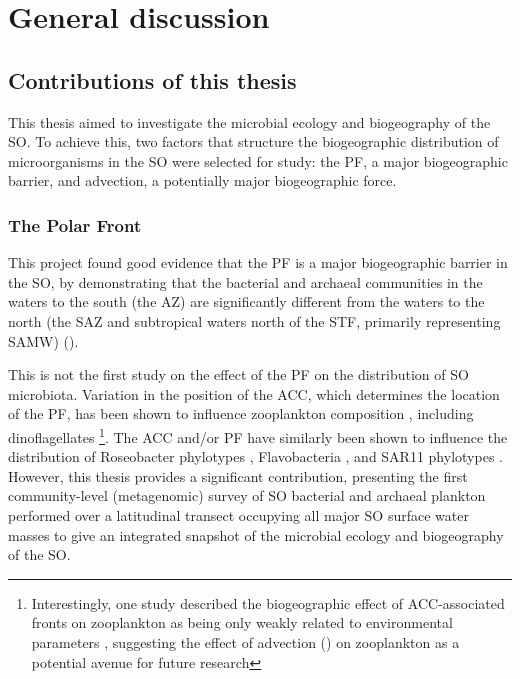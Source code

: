 \chapter{General discussion}
\label{ch:generaldiscussion}

\section{Contributions of this thesis}

This thesis aimed to investigate the microbial ecology and biogeography of the \ac{SO}.
To achieve this, two factors that structure the biogeographic distribution of microorganisms in the \ac{SO} were selected for study: the \ac{PF}, a major biogeographic barrier, and advection, a potentially major biogeographic force.

\subsection{The Polar Front}

This project found good evidence that the \ac{PF} is a major biogeographic barrier in the \ac{SO}, by demonstrating that the bacterial and archaeal communities in the waters to the south (the \ac{AZ}) are significantly different from the waters to the north (the \ac{SAZ} and subtropical waters north of the \ac{STF}, primarily representing \ac{SAMW}) ().

This is not the first study on the effect of the \ac{PF} on the distribution of \ac{SO} microbiota.
Variation in the position of the \ac{ACC}, which determines the location of the \ac{PF}, has been shown to influence zooplankton composition \citep[e.g.][]{Chiba:2001un,Hunt:2001vp}, including dinoflagellates \cite{Esper:2002ui}\footnote{Interestingly, one study described the biogeographic effect of \ac{ACC}-associated fronts on zooplankton as being only weakly related to environmental parameters \cite{Ward:2003db}, suggesting the effect of advection () on zooplankton as a potential avenue for future research}.
The \ac{ACC} and/or \ac{PF} have similarly been shown to influence the distribution of Roseobacter phylotypes \cite{Selje:2004ka,Giebel:2009hr}, Flavobacteria \cite{Abell:2005ji}, and SAR11 phylotypes \cite{Giebel:2009hr}.
However, this thesis provides a significant contribution, presenting the first community-level (metagenomic) survey of \ac{SO} bacterial and archaeal plankton performed over a latitudinal transect occupying all major \ac{SO} surface water masses to give an integrated snapshot of the microbial ecology and biogeography of the \ac{SO}.

